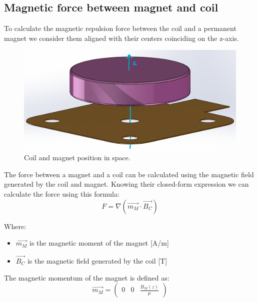 \subsection{Magnetic force between magnet and coil}
To calculate the magnetic repulsion force between the coil and a permanent magnet we consider them aligned with their centers coinciding on the z-axis.
\begin{figure}
    \centering
    \includegraphics[scale=0.4]{Chapters/Chapter2/Modelling_of_Entire_System/Figures/coil_magnet.png} %
    \caption[Coil-Magnet position]{Coil and magnet position in space.}
    \label{fig: Coil-Magnet position}
\end{figure}

The force between a magnet and a coil can be calculated using the magnetic field generated by the coil and magnet.
Knowing their closed-form expression we can calculate the force using this formula:
\begin{equation}
    F = \nabla (\overrightarrow{m_M} \cdot \overrightarrow{B_C}) %
\end{equation}

Where: 
\begin{itemize}
    \item $\overrightarrow{m_M}$ is the magnetic moment of the magnet [A/m]
    \item $\overrightarrow{B_C}$ is the magnetic field generated by the coil [T]
\end{itemize}

The magnetic momentum of the magnet is defined as:
\begin{equation}
    \overrightarrow{m_M} = 
    \begin{pmatrix}
        0 & 0 & \frac{B_M(z)}{\mu}
    \end{pmatrix}
\end{equation}

